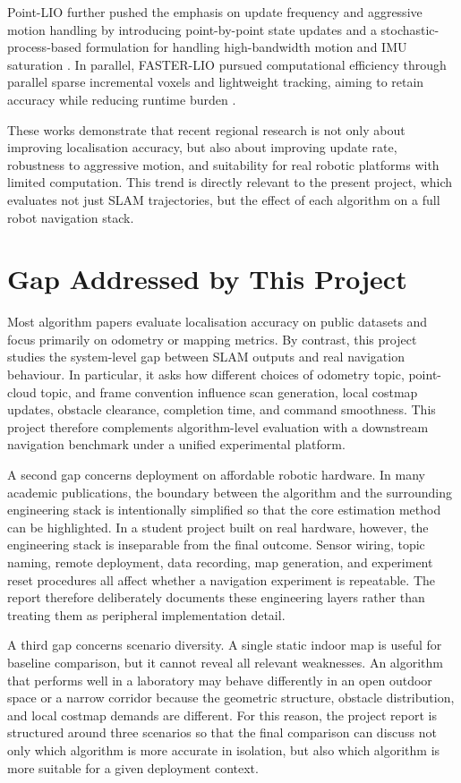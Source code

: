 \documentclass[12pt,a4paper]{report}
\begin{document}
Point-LIO further pushed the emphasis on update frequency and aggressive motion handling by introducing point-by-point state updates and a stochastic-process-based formulation for handling high-bandwidth motion and IMU saturation \citep{he2023pointlio}. In parallel, FASTER-LIO pursued computational efficiency through parallel sparse incremental voxels and lightweight tracking, aiming to retain accuracy while reducing runtime burden \citep{bai2022fasterlio}.

These works demonstrate that recent regional research is not only about improving localisation accuracy, but also about improving update rate, robustness to aggressive motion, and suitability for real robotic platforms with limited computation. This trend is directly relevant to the present project, which evaluates not just SLAM trajectories, but the effect of each algorithm on a full robot navigation stack.

\section{Gap Addressed by This Project}
Most algorithm papers evaluate localisation accuracy on public datasets and focus primarily on odometry or mapping metrics. By contrast, this project studies the system-level gap between SLAM outputs and real navigation behaviour. In particular, it asks how different choices of odometry topic, point-cloud topic, and frame convention influence scan generation, local costmap updates, obstacle clearance, completion time, and command smoothness. This project therefore complements algorithm-level evaluation with a downstream navigation benchmark under a unified experimental platform.

A second gap concerns deployment on affordable robotic hardware. In many academic publications, the boundary between the algorithm and the surrounding engineering stack is intentionally simplified so that the core estimation method can be highlighted. In a student project built on real hardware, however, the engineering stack is inseparable from the final outcome. Sensor wiring, topic naming, remote deployment, data recording, map generation, and experiment reset procedures all affect whether a navigation experiment is repeatable. The report therefore deliberately documents these engineering layers rather than treating them as peripheral implementation detail.

A third gap concerns scenario diversity. A single static indoor map is useful for baseline comparison, but it cannot reveal all relevant weaknesses. An algorithm that performs well in a laboratory may behave differently in an open outdoor space or a narrow corridor because the geometric structure, obstacle distribution, and local costmap demands are different. For this reason, the project report is structured around three scenarios so that the final comparison can discuss not only which algorithm is more accurate in isolation, but also which algorithm is more suitable for a given deployment context.
\end{document}
